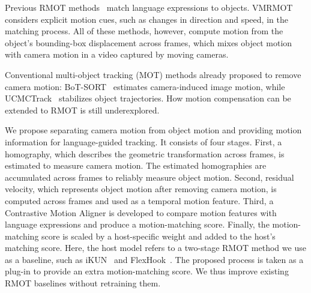 \documentclass{article}
\begin{document}
Previous RMOT methods~\cite{transrmot,ikun,flexhook} match language expressions to objects.  VMRMOT~\cite{vmrmot} considers explicit motion cues, such as changes in direction and speed, in the matching process. All of these methods, however, compute motion from the object's bounding-box displacement across frames, which mixes object motion with camera motion in a video captured by moving cameras.

Conventional multi-object tracking (MOT) methods already proposed to remove camera motion: BoT-SORT~\cite{botsort} estimates camera-induced image motion, while UCMCTrack~\cite{ucmctrack} stabilizes object trajectories. How motion compensation can be extended to RMOT is still underexplored.


We propose separating camera motion from object motion and providing motion information for language-guided tracking. It consists of four stages. First, a homography, which describes the geometric transformation across frames, is estimated to measure camera motion. The estimated homographies are accumulated across frames to reliably measure object motion. Second, residual velocity, which represents object motion after removing camera motion, is computed across frames and used as a temporal motion feature. Third, a Contrastive Motion Aligner is developed to compare motion features with language expressions and produce a motion-matching score. Finally, the motion-matching score is scaled by a host-specific weight and added to the host's matching score. Here, the host model refers to a two-stage RMOT method we use as a baseline, such as iKUN~\cite{ikun} and FlexHook~\cite{flexhook}. The proposed process is taken as a plug-in to provide an extra motion-matching score. We thus improve existing RMOT baselines without retraining them.
\end{document}
